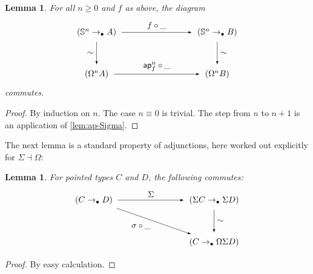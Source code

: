 \documentclass[11pt,a4paper,oneside,reqno]{amsart}
\newtheorem{lemma}[theorem]{Lemma}
\theoremstyle{definition}
\theoremstyle{remark}
\newcommand{\sph}[1]{{\mathbb S}^{#1}}
\newcommand{\pointedm}{\rightarrow_\bullet}
\begin{document}
\begin{lemma}\label{lem:iterated-ap-Sigma}
 For all $n \geq 0$ and $f$ as above, the diagram
\begin{equation}
\begin{tikzpicture}[x=5cm,y=-1.75cm,baseline=(current bounding box.center)]
 \tikzset{arrow/.style={shorten >=0.1cm,shorten <=.1cm,-latex}}
 \node (A) at (0,0) {$(\sph n \pointedm A)$}; 
 \node (D) at (1,0) {$(\sph n \pointedm B)$}; 
 \node (B) at (0,1) {$(\Omega^n A)$}; 
 \node (C) at (1,1) {$(\Omega^n B)$}; 

 \draw[arrow] (A) to node [above] {$f \circ \_$} (D);
 \draw[arrow] (A) to node [left] {$\sim$} (B);
 \draw[arrow] (B) to node [above] {$\mathsf{ap}_f^n \circ \_$} (C);
 \draw[arrow] (D) to node [right] {$\sim$} (C);
\end{tikzpicture}
\end{equation}
 commutes.
\end{lemma}
\begin{proof}
 By induction on $n$. The case $n \equiv 0$ is trivial.
 The step from $n$ to $n+1$ is an application of \cref{lem:ap-Sigma}.
\end{proof}





The next lemma is a standard property of adjunctions, here worked out explicitly for $\Sigma \dashv \Omega$:
\begin{lemma} \label{lem:adj-prop}
 For pointed types $C$ and $D$, the following commutes:
\begin{equation}
\begin{tikzpicture}[x=5cm,y=-1.75cm,baseline=(current bounding box.center)]
 \tikzset{arrow/.style={shorten >=0.1cm,shorten <=.1cm,-latex}}
 \node (A) at (0,0) {$(C \pointedm D)$}; 
 \node (D) at (1,0) {$(\Sigma C \pointedm \Sigma D)$}; 
 \node (C) at (1,1) {$(C \pointedm \Omega \Sigma D)$}; 

 \draw[arrow] (A) to node [above] {$\Sigma$} (D);
 \draw[arrow] (A) to node [below left] {$\sigma \circ \_$} (C);
 \draw[arrow] (D) to node [right] {$\sim$} (C);
\end{tikzpicture}
\end{equation}
\end{lemma}
\begin{proof}
 By easy calculation.
\end{proof}
\end{document}

